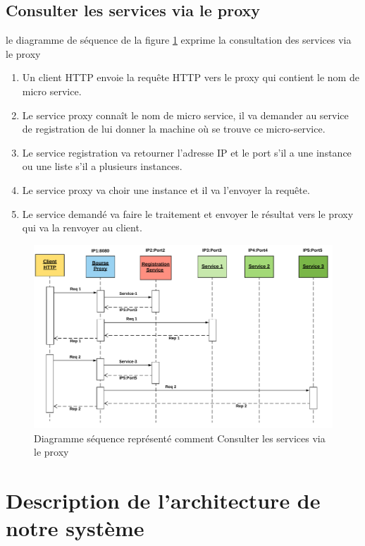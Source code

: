       \subsection{Consulter les services via le proxy }
    le diagramme de séquence de la figure \ref{fig:secance}   exprime  la  consultation des services via le proxy 
    \begin{enumerate}
    	
    	\item Un client HTTP envoie la requête HTTP vers le proxy qui contient le nom de micro service.  
    	
    	\item  Le service proxy connaît le nom de micro service, il va demander au service de registration de lui donner la machine où se trouve ce micro-service. 
    	
    	\item Le service registration  va retourner l'adresse IP et le port s'il a une instance ou une liste s'il a  plusieurs instances.
    	
    	\item  Le service proxy va choir une instance et il va l'envoyer la requête.  
    	
    	\item  Le service demandé va faire le traitement et envoyer le résultat vers le proxy qui va la renvoyer au client. 
    \end{enumerate}
    
    
    \begin{figure}[H]
    	\centering
    	\includegraphics[width=0.7\linewidth]{images/secance}
    	\caption{Diagramme séquence représenté comment  Consulter les services via le proxy}
    	\label{fig:secance}
    \end{figure}
    
    
    
    
    
    \section{Description de l'architecture de notre système}
    
